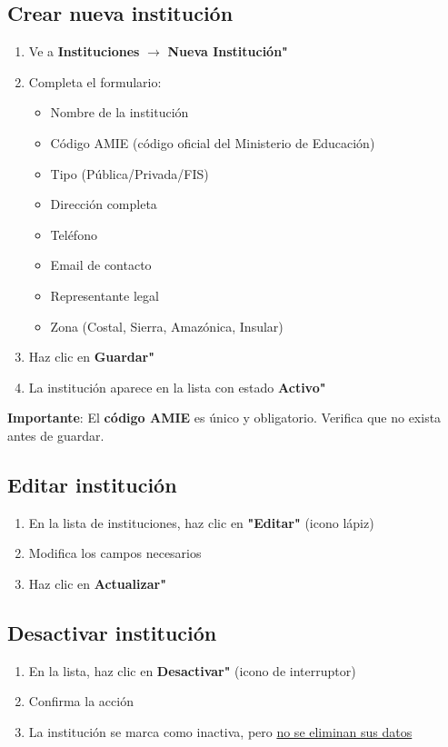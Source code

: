 \documentclass[12pt, a4paper]{report}
\begin{document}
\subsection{Crear nueva institución}
\begin{enumerate}
    \item Ve a \textbf{ Instituciones} $\rightarrow$ \textbf{Nueva Institución"}
    \item Completa el formulario:
    \begin{itemize}
        \item Nombre de la institución
        \item Código AMIE (código oficial del Ministerio de Educación)
        \item Tipo (Pública/Privada/FIS)
        \item Dirección completa
        \item Teléfono
        \item Email de contacto
        \item Representante legal
        \item Zona (Costal, Sierra, Amazónica, Insular)
    \end{itemize}
    \item Haz clic en \textbf{Guardar"}
    \item La institución aparece en la lista con estado \textbf{Activo"}
\end{enumerate}

\textbf{Importante}: El \textbf{código AMIE} es único y obligatorio. Verifica que no exista antes de guardar.

\subsection{Editar institución}
\begin{enumerate}
    \item En la lista de instituciones, haz clic en \textbf{"Editar"} (icono lápiz)
    \item Modifica los campos necesarios
    \item Haz clic en \textbf{Actualizar"}
\end{enumerate}

\subsection{Desactivar institución}
\begin{enumerate}
    \item En la lista, haz clic en \textbf{Desactivar"} (icono de interruptor)
    \item Confirma la acción
    \item La institución se marca como inactiva, pero \underline{no se eliminan sus datos}
\end{enumerate}
\end{document}
